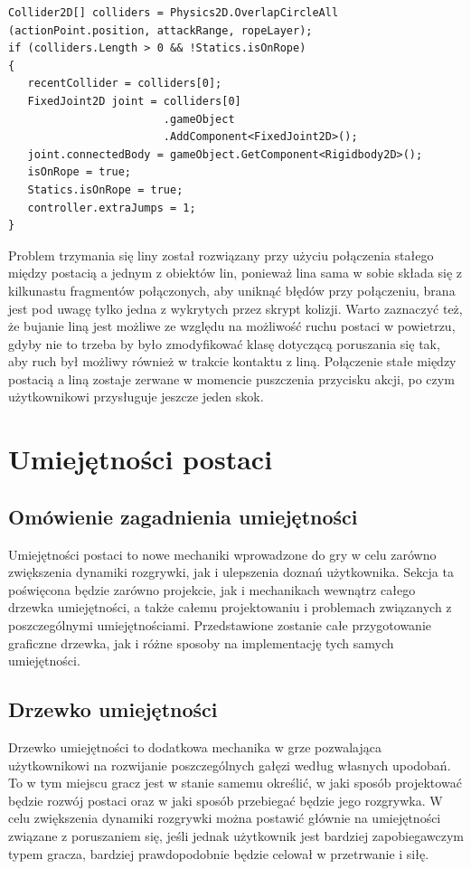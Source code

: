 \documentclass[oneside,polski,logo]{amuthesis}
\begin{document}
\newpage
\begin{lstlisting}[breaklines=true,
language={[Sharp]C},
rulecolor=\color{blue!80!black},
caption={Fragment klasy \texttt{PlayerMovement.cs}}
]    
Collider2D[] colliders = Physics2D.OverlapCircleAll
(actionPoint.position, attackRange, ropeLayer);
if (colliders.Length > 0 && !Statics.isOnRope)
{
   recentCollider = colliders[0];
   FixedJoint2D joint = colliders[0]
                        .gameObject
                        .AddComponent<FixedJoint2D>();
   joint.connectedBody = gameObject.GetComponent<Rigidbody2D>();
   isOnRope = true;
   Statics.isOnRope = true;
   controller.extraJumps = 1;
}

\end{lstlisting}

Problem trzymania się liny został rozwiązany przy użyciu połączenia stałego między postacią a jednym z obiektów lin, ponieważ lina sama w sobie składa się z kilkunastu fragmentów połączonych, aby uniknąć błędów przy połączeniu, brana jest pod uwagę tylko jedna z wykrytych przez skrypt kolizji. Warto zaznaczyć też, że bujanie liną jest możliwe ze względu na możliwość ruchu postaci w powietrzu, gdyby nie to trzeba by było zmodyfikować klasę dotyczącą poruszania się tak, aby ruch był możliwy również w trakcie kontaktu z liną. Połączenie stałe między postacią a liną zostaje zerwane w momencie puszczenia przycisku akcji, po czym użytkownikowi przysługuje jeszcze jeden skok.

\section{Umiejętności postaci}
\subsection{Omówienie zagadnienia umiejętności}
Umiejętności postaci to nowe mechaniki wprowadzone do gry w celu zarówno zwiększenia dynamiki rozgrywki, jak i ulepszenia doznań użytkownika. Sekcja ta poświęcona będzie zarówno projekcie, jak i mechanikach wewnątrz całego drzewka umiejętności, a także całemu projektowaniu i problemach związanych z poszczególnymi umiejętnościami. Przedstawione zostanie całe przygotowanie graficzne drzewka, jak i różne sposoby na implementację tych samych umiejętności.

\subsection{Drzewko umiejętności}
Drzewko umiejętności to dodatkowa mechanika w grze pozwalająca użytkownikowi na rozwijanie poszczególnych gałęzi według własnych upodobań. To w tym miejscu gracz jest w stanie samemu określić, w jaki sposób projektować będzie rozwój postaci oraz w jaki sposób przebiegać będzie jego rozgrywka. W celu zwiększenia dynamiki rozgrywki można postawić głównie na umiejętności związane z poruszaniem się, jeśli jednak użytkownik jest bardziej zapobiegawczym typem gracza, bardziej prawdopodobnie będzie celował w przetrwanie i siłę.
\end{document}
